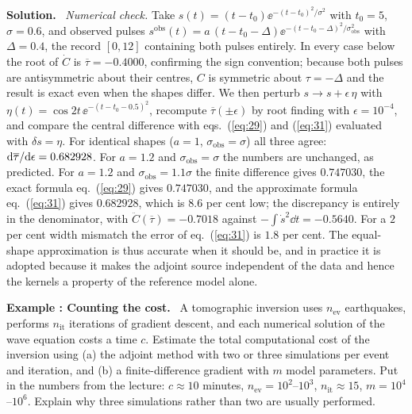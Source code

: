 \documentclass[a4paper,12pt]{paper}
\newcounter{example}
\renewenvironment{example}[1]{%
  \refstepcounter{example}%
  \begin{mdframed}[linewidth=1pt,innertopmargin=6pt,innerbottommargin=6pt]%
  \noindent\textbf{Example \theexample: #1.}\ }{%
  \end{mdframed}}
\newenvironment{solution}{\par\noindent\textbf{Solution.}\ }{\par\medskip}
\begin{document}
\begin{solution}
\emph{Numerical check.} Take $s(t)=(t-t_{0})\ee^{-(t-t_{0})^{2}/\sigma^{2}}$ with $t_{0}=5$, $\sigma=0.6$, and observed pulses
$s^{\mathrm{obs}}(t)=a\,(t-t_{0}-\Delta)\ee^{-(t-t_{0}-\Delta)^{2}/\sigma_{\mathrm{obs}}^{2}}$ with $\Delta=0.4$, the record
$[0,12]$ containing both pulses entirely. In every case below the root of $\dot{C}$ is $\overline{\tau}=-0.4000$, confirming
the sign convention; because both pulses are antisymmetric about their centres, $C$ is symmetric about $\tau=-\Delta$ and the
result is exact even when the shapes differ. We then perturb $s\to s+\epsilon\,\eta$ with
$\eta(t)=\cos2t\,\ee^{-(t-t_{0}-0.5)^{2}}$, recompute $\overline{\tau}(\pm\epsilon)$ by root finding with $\epsilon=10^{-4}$, and
compare the central difference with eqs.~(\ref{eq:29}) and (\ref{eq:31}) evaluated with $\delta s=\eta$. For identical
shapes ($a=1$, $\sigma_{\mathrm{obs}}=\sigma$) all three agree: $\mathrm{d}\overline{\tau}/\mathrm{d}\epsilon=0.682928$. For $a=1.2$ and
$\sigma_{\mathrm{obs}}=\sigma$ the numbers are unchanged, as predicted. For $a=1.2$ and $\sigma_{\mathrm{obs}}=1.1\sigma$ the
finite difference gives $0.747030$, the exact formula eq.~(\ref{eq:29}) gives $0.747030$, and the approximate formula
eq.~(\ref{eq:31}) gives $0.682928$, which is $8.6$ per cent low; the discrepancy is entirely in the denominator, with
$\ddot{C}(\overline{\tau})=-0.7018$ against $-\int\dot{s}^{2}\dd t=-0.5640$. For a $2$ per cent width mismatch the error of
eq.~(\ref{eq:31}) is $1.8$ per cent. The equal-shape approximation is thus accurate when it should be, and in practice it is
adopted because it makes the adjoint source independent of the data and hence the kernels a property of the reference model
alone.
\end{solution}

\begin{example}{Counting the cost}
A tomographic inversion uses $n_{\mathrm{ev}}$ earthquakes, performs $n_{\mathrm{it}}$ iterations of gradient descent, and
each numerical solution of the wave equation costs a time $c$. Estimate the total computational cost of the inversion using
(a) the adjoint method with two or three simulations per event and iteration, and (b) a finite-difference gradient with $m$
model parameters. Put in the numbers from the lecture: $c\approx10$ minutes, $n_{\mathrm{ev}}=10^{2}$--$10^{3}$,
$n_{\mathrm{it}}\approx15$, $m=10^{4}$--$10^{6}$. Explain why three simulations rather than two are usually performed.
\end{example}
\end{document}
